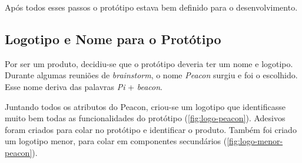 Após todos esses passos o protótipo estava bem definido para o desenvolvimento.

\subsection{Logotipo e Nome para o Protótipo}\label{sec:logotipo-prototipo}

Por ser um produto, decidiu-se que o protótipo deveria ter um nome e logotipo. Durante algumas reuniões de \textit{brainstorm}, o nome \textit{Peacon} surgiu e foi o escolhido. Esse nome deriva das palavras \textit{Pi}  + \textit{beacon}.

Juntando todos os atributos do Peacon, criou-se um logotipo que identificasse muito bem todas as funcionalidades do protótipo (\autoref{fig:logo-peacon}). Adesivos foram criados para colar no protótipo e identificar o produto. Também foi criado um logotipo menor, para colar em componentes secundários (\autoref{fig:logo-menor-peacon}).


